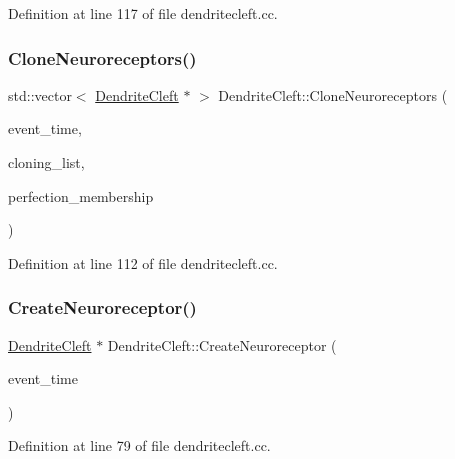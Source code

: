 Definition at line 117 of file dendritecleft.\+cc.

\mbox{\label{class_dendrite_cleft_a93b542418482f3732380e33346e23bd2}} 
\subsubsection{\texorpdfstring{Clone\+Neuroreceptors()}{CloneNeuroreceptors()}}
{\footnotesize\ttfamily std\+::vector$<$ \mbox{\hyperlink{class_dendrite_cleft}{Dendrite\+Cleft}} $\ast$ $>$ Dendrite\+Cleft\+::\+Clone\+Neuroreceptors (\begin{DoxyParamCaption}\item[{std\+::chrono\+::time\+\_\+point$<$ \mbox{\hyperlink{universe_8h_a0ef8d951d1ca5ab3cfaf7ab4c7a6fd80}{Clock}} $>$}]{event\+\_\+time,  }\item[{std\+::vector$<$ \mbox{\hyperlink{class_dendrite_cleft}{Dendrite\+Cleft}} $\ast$$>$}]{cloning\+\_\+list,  }\item[{double}]{perfection\+\_\+membership }\end{DoxyParamCaption})}



Definition at line 112 of file dendritecleft.\+cc.

\mbox{\label{class_dendrite_cleft_ac84d3e0cafecd1436c34162f687e3851}} 
\subsubsection{\texorpdfstring{Create\+Neuroreceptor()}{CreateNeuroreceptor()}}
{\footnotesize\ttfamily \mbox{\hyperlink{class_dendrite_cleft}{Dendrite\+Cleft}} $\ast$ Dendrite\+Cleft\+::\+Create\+Neuroreceptor (\begin{DoxyParamCaption}\item[{std\+::chrono\+::time\+\_\+point$<$ \mbox{\hyperlink{universe_8h_a0ef8d951d1ca5ab3cfaf7ab4c7a6fd80}{Clock}} $>$}]{event\+\_\+time }\end{DoxyParamCaption})}



Definition at line 79 of file dendritecleft.\+cc.

